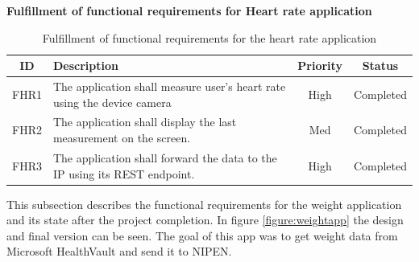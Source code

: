 \textbf{Fulfillment of functional requirements for Heart rate application}

\begin{table}[H]
\begin{center}
\begin{tabular}{ | c | p{9cm} | c | c |}
  \hline
  ID & Description & Priority & Status\\
  \hline\noalign{\smallskip}\noalign{\smallskip}\hline
  FHR1	& The application shall measure user’s heart rate using the device camera    & High & Completed \\
  FHR2	& The application shall display the last measurement on the screen.          & Med & Completed \\
  FHR3	& The application shall forward the data to the IP using its REST endpoint.  & High & Completed \\
  \hline
\end{tabular}
\end{center}
\caption{Fulfillment of functional requirements for the heart rate application}
\label{table:fulfillemntofapp}
\end{table}


This subsection describes the functional requirements for the weight application and its state after the project completion.
In figure \ref{figure:weightapp} the design and final version can be seen.
The goal of this app was to get weight data from Microsoft HealthVault and send it to NIPEN.

